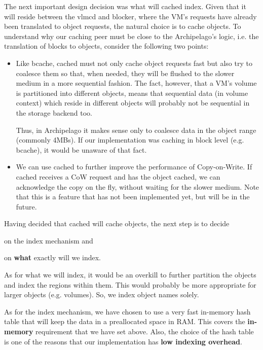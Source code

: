 The next important design decision was what will cached index. Given that it 
will reside between the vlmcd and blocker, where the VM's requests have already 
been translated to object requests, the natural choice is to cache objects. To 
understand why our caching peer must be close to the Archipelago's logic, i.e.  
the translation of blocks to objects, consider the following two points:

\begin{itemize}
\item Like bcache, cached must not only cache object requests fast but also try 
	to coalesce them so that, when needed, they will be flushed to the 
	slower medium in a more sequential fashion. The fact, however, that a 
	VM's volume is partitioned into different objects, means that 
	sequential data (in volume context) which reside in different objects 
	will probably not be sequential in the storage backend too.
	
	Thus, in Archipelago it makes sense only to coalesce data in the object 
	range (commonly 4MBs). If our implementation was caching in block level 
	(e.g. bcache), it would be unaware of that fact.
\item We can use cached to further improve the performance of Copy-on-Write.  
	If cached receives a CoW request and has the object cached, we can
	acknowledge the copy on the fly, without waiting for the slower medium.  
	Note that this is a feature that has not been implemented yet, but will be 
	in the future.
\end{itemize}

Having decided that cached will cache objects, the next step is to decide
\begin{inparaenum}[(i)]
\item on the index mechanism and
\item on \textbf{what} exactly will we index.
\end{inparaenum}

As for what we will index, it would be an overkill to further partition the 
objects and index the regions within them. This would probably be more 
appropriate for larger objects (e.g. volumes).  So, we index object names 
solely.

As for the index mechanism, we have chosen to use a very fast in-memory hash 
table that will keep the data in a preallocated space in RAM. This covers the 
\textbf{in-memory} requirement that we have set above. Also, the choice of the 
hash table is one of the reasons that our implementation has \textbf{low 
	indexing overhead}.


